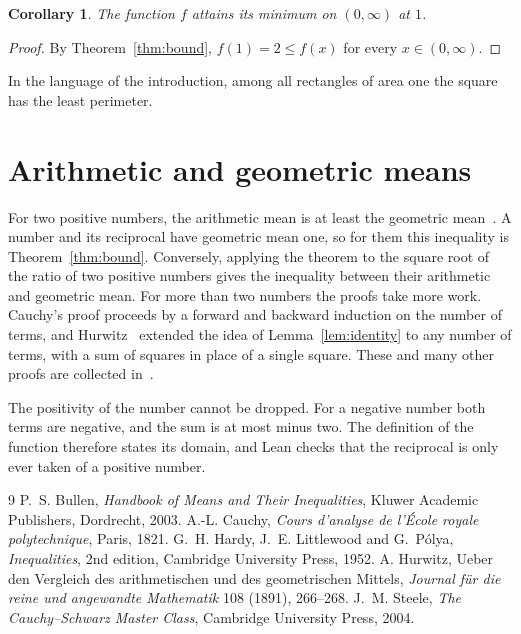 \documentclass{article}
\newtheorem{corollary}[lemma]{Corollary}
\begin{document}
\begin{corollary}\label{cor:min}
The function $f$ attains its minimum on $(0,\infty)$ at $1$.
\end{corollary}

\begin{proof}
By Theorem~\ref{thm:bound}, $f(1)=2\le f(x)$ for every $x\in(0,\infty)$.
\end{proof}

In the language of the introduction, among all rectangles of area one the square has the least perimeter.

\section{Arithmetic and geometric means}\label{sec:means}

For two positive numbers, the arithmetic mean is at least the geometric mean~\cite{hardy1952}.
A number and its reciprocal have geometric mean one, so for them this inequality is Theorem~\ref{thm:bound}.
Conversely, applying the theorem to the square root of the ratio of two positive numbers gives the inequality between their arithmetic and geometric mean.
For more than two numbers the proofs take more work.
Cauchy's proof proceeds by a forward and backward induction on the number of terms, and Hurwitz~\cite{hurwitz1891} extended the idea of Lemma~\ref{lem:identity} to any number of terms, with a sum of squares in place of a single square.
These and many other proofs are collected in~\cite{bullen2003,steele2004}.

The positivity of the number cannot be dropped.
For a negative number both terms are negative, and the sum is at most minus two.
The definition of the function therefore states its domain, and Lean checks that the reciprocal is only ever taken of a positive number.

\begin{thebibliography}{9}
 P.~S. Bullen, \emph{Handbook of Means and Their Inequalities}, Kluwer Academic Publishers, Dordrecht, 2003.
 A.-L. Cauchy, \emph{Cours d'analyse de l'\'Ecole royale polytechnique}, Paris, 1821.
 G.~H. Hardy, J.~E. Littlewood and G.~P\'olya, \emph{Inequalities}, 2nd edition, Cambridge University Press, 1952.
 A. Hurwitz, Ueber den Vergleich des arithmetischen und des geometrischen Mittels, \emph{Journal f\"ur die reine und angewandte Mathematik} 108 (1891), 266--268.
 J.~M. Steele, \emph{The Cauchy--Schwarz Master Class}, Cambridge University Press, 2004.
\end{thebibliography}
\end{document}
